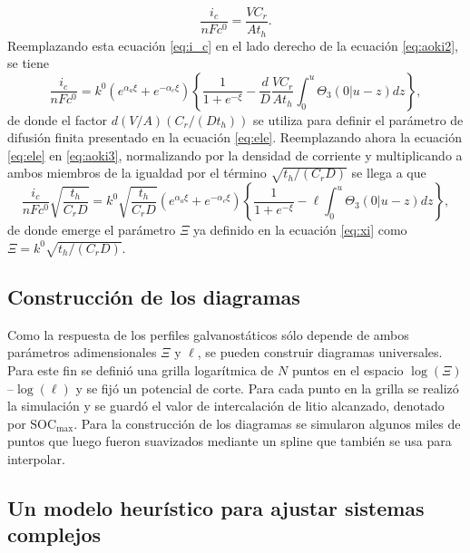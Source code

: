 \begin{equation}\label{eq:i_c}
    \frac{i_c}{n F c^0} = \frac{V C_r}{A t_h}.
\end{equation}
Reemplazando esta ecuación \ref{eq:i_c} en el lado derecho de la ecuación 
\ref{eq:aoki2}, se tiene
\begin{equation}\label{eq:aoki3}
    \frac{i_c}{n F c^0} = k^0 \left(e^{\alpha_a \xi} + e^{-\alpha_c \xi}\right) \left\{ \frac{1}{1+e^{-\xi}} - \frac{d}{D} \frac{V C_r}{A t_h} \int_0^u \Theta_3(0|u - z) dz \right\},
\end{equation}
de donde el factor $d (V/A) (C_r / (D t_h))$ se utiliza para definir el 
parámetro de difusión finita presentado en la ecuación \ref{eq:ele}. Reemplazando 
ahora la ecuación \ref{eq:ele} en \ref{eq:aoki3}, normalizando por la densidad 
de corriente y multiplicando a ambos miembros de la igualdad por el término 
$\sqrt{t_h / (C_r D)}$ se llega a que
\begin{equation}\label{eq:aoki4}
    \frac{i_c}{n F c^0} \sqrt{\frac{t_h}{C_r D}} = k^0 \sqrt{\frac{t_h}{C_r D}}\left(e^{\alpha_a \xi} + e^{-\alpha_c \xi}\right) \left\{ \frac{1}{1+e^{-\xi}} - \ell \int_0^u \Theta_3(0|u - z) dz \right\},
\end{equation}
de donde emerge el parámetro $\Xi$ ya definido en la ecuación \ref{eq:xi} como 
$\Xi = k^0 \sqrt{t_h / (C_r D)}$.


\subsection{Construcción de los diagramas}

Como la respuesta de los perfiles galvanostáticos sólo depende de ambos parámetros
adimensionales $\Xi$ y $\ell$, se pueden construir diagramas universales. Para 
este fin se definió una grilla logarítmica de $N$ puntos en el espacio 
$\log(\Xi)$--$\log(\ell)$ y se fijó un potencial de corte. Para cada punto en la 
grilla se realizó la simulación y se guardó el valor de intercalación de litio
alcanzado, denotado por $\text{SOC}_{\max}$. Para la construcción de los diagramas 
se simularon algunos miles de puntos que luego fueron suavizados mediante un spline
que también se usa para interpolar.


\subsection{Un modelo heurístico para ajustar sistemas complejos}

